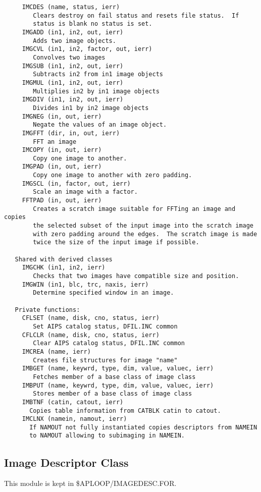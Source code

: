 {\begin{verbatim}
     IMCDES (name, status, ierr)
        Clears destroy on fail status and resets file status.  If
        status is blank no status is set.
     IMGADD (in1, in2, out, ierr)
        Adds two image objects.
     IMGCVL (in1, in2, factor, out, ierr)
        Convolves two images
     IMGSUB (in1, in2, out, ierr)
        Subtracts in2 from in1 image objects
     IMGMUL (in1, in2, out, ierr)
        Multiplies in2 by in1 image objects
     IMGDIV (in1, in2, out, ierr)
        Divides in1 by in2 image objects
     IMGNEG (in, out, ierr)
        Negate the values of an image object.
     IMGFFT (dir, in, out, ierr)
        FFT an image
     IMCOPY (in, out, ierr)
        Copy one image to another.
     IMGPAD (in, out, ierr)
        Copy one image to another with zero padding.
     IMGSCL (in, factor, out, ierr)
        Scale an image with a factor.
     FFTPAD (in, out, ierr)
        Creates a scratch image suitable for FFTing an image and copies
        the selected subset of the input image into the scratch image
        with zero padding around the edges.  The scratch image is made
        twice the size of the input image if possible.

   Shared with derived classes
     IMGCHK (in1, in2, ierr)
        Checks that two images have compatible size and position.
     IMGWIN (in1, blc, trc, naxis, ierr)
        Determine specified window in an image.

   Private functions:
     CFLSET (name, disk, cno, status, ierr)
        Set AIPS catalog status, DFIL.INC common
     CFLCLR (name, disk, cno, status, ierr)
        Clear AIPS catalog status, DFIL.INC common
     IMCREA (name, ierr)
        Creates file structures for image "name"
     IMBGET (name, keywrd, type, dim, value, valuec, ierr)
        Fetches member of a base class of image class
     IMBPUT (name, keywrd, type, dim, value, valuec, ierr)
        Stores member of a base class of image class
     IMBTNF (catin, catout, ierr)
       Copies table information from CATBLK catin to catout.
     IMCLNX (namein, namout, ierr)
       If NAMOUT not fully instantiated copies descriptors from NAMEIN
       to NAMOUT allowing to subimaging in NAMEIN.
\end{verbatim}}

\subsection{Image Descriptor Class}

   This module is kept in \$APLOOP/IMAGEDESC.FOR.

